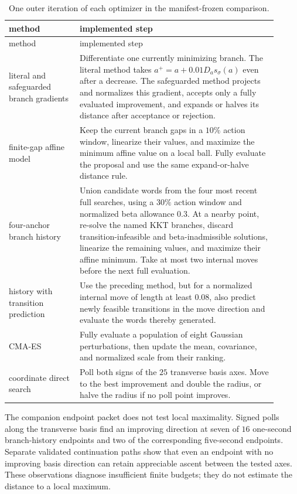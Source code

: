 \begingroup
\small
\begin{longtable}{@{}p{0.24\linewidth}p{0.67\linewidth}@{}}
\caption{One outer iteration of each optimizer in the manifest-frozen
comparison.}
\label{tab:black-box-datascience-f10-optimizer-steps}\\
\toprule
method & implemented step\\
\midrule
\endfirsthead
\toprule
method & implemented step\\
\midrule
\endhead
literal and safeguarded branch gradients
& Differentiate one currently minimizing branch.  The literal method takes
  \(a^+=a+0.01D_as_\sigma(a)\) even after a decrease.  The safeguarded method
  projects and normalizes this gradient, accepts only a fully evaluated
  improvement, and expands or halves its distance after acceptance or
  rejection.\\
finite-gap affine model
& Keep the current branch gaps in a \(10\%\) action window, linearize their
  values, and maximize the minimum affine value on a local ball.  Fully
  evaluate the proposal and use the same expand-or-halve distance rule.\\
four-anchor branch history
& Union candidate words from the four most recent full searches, using a
  \(30\%\) action window and normalized beta allowance \(0.3\).  At a nearby
  point, re-solve the named KKT branches, discard transition-infeasible and
  beta-inadmissible solutions, linearize the remaining values, and maximize
  their affine minimum.  Take at most two internal moves before the next full
  evaluation.\\
history with transition prediction
& Use the preceding method, but for a normalized internal move of length at
  least \(0.08\), also predict newly feasible transitions in the move
  direction and evaluate the words thereby generated.\\
CMA-ES
& Fully evaluate a population of eight Gaussian perturbations, then update
  the mean, covariance, and normalized scale from their ranking.\\
coordinate direct search
& Poll both signs of the \(25\) transverse basis axes.  Move to the best
  improvement and double the radius, or halve the radius if no poll point
  improves.\\
\bottomrule
\end{longtable}
\endgroup

The companion endpoint packet does not test local maximality.  Signed polls
along the transverse basis find an improving direction at seven of \(16\)
one-second branch-history endpoints and two of the corresponding five-second
endpoints.  Separate validated continuation paths show that even an endpoint
with no improving basis direction can retain appreciable ascent between the
tested axes.  These observations diagnose insufficient finite budgets; they
do not estimate the distance to a local maximum.

